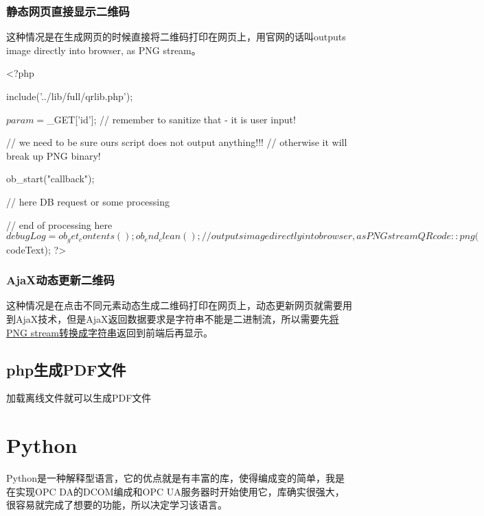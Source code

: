 \subsubsection{静态网页直接显示二维码}
这种情况是在生成网页的时候直接将二维码打印在网页上，用官网的话叫outputs image directly into browser, as PNG stream。
\begin{shell}
 <?php

    include('../lib/full/qrlib.php');
        
    $param = $_GET['id']; // remember to sanitize that - it is user input!
    
    // we need to be sure ours script does not output anything!!!
    // otherwise it will break up PNG binary!
    
    ob_start("callback");
    
    // here DB request or some processing
    
    // end of processing here
    $debugLog = ob_get_contents();
    ob_end_clean();
    
    // outputs image directly into browser, as PNG stream
    QRcode::png($codeText); 
?>
\end{shell}
\subsubsection{AjaX动态更新二维码}
这种情况是在点击不同元素动态生成二维码打印在网页上，动态更新网页就需要用到AjaX技术，但是AjaX返回数据要求是字符串不能是二进制流，所以需要先\href{https://blog.csdn.net/LJFPHP/article/details/79111844}{将PNG stream转换成字符串}返回到前端后再显示。
\subsection{php生成PDF文件}
加载离线文件就可以生成PDF文件
\section{Python}
Python是一种解释型语言，它的优点就是有丰富的库，使得编成变的简单，我是在实现OPC DA的DCOM编成和OPC UA服务器时开始使用它，库确实很强大，很容易就完成了想要的功能，所以决定学习该语言。
